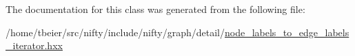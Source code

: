 The documentation for this class was generated from the following file\+:\begin{DoxyCompactItemize}
\item 
/home/tbeier/src/nifty/include/nifty/graph/detail/\hyperlink{node__labels__to__edge__labels__iterator_8hxx}{node\+\_\+labels\+\_\+to\+\_\+edge\+\_\+labels\+\_\+iterator.\+hxx}\end{DoxyCompactItemize}
